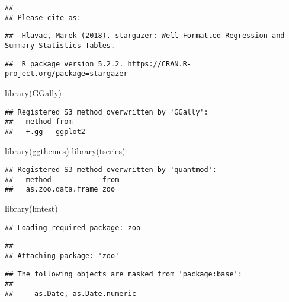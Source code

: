 \documentclass[
]{article}
\newenvironment{Shaded}{\begin{snugshade}}{\end{snugshade}}
\newcommand{\FunctionTok}[1]{\textcolor[rgb]{0.00,0.00,0.00}{#1}}
\newcommand{\NormalTok}[1]{#1}
\begin{document}
\begin{verbatim}
## 
## Please cite as:
\end{verbatim}

\begin{verbatim}
##  Hlavac, Marek (2018). stargazer: Well-Formatted Regression and Summary Statistics Tables.
\end{verbatim}

\begin{verbatim}
##  R package version 5.2.2. https://CRAN.R-project.org/package=stargazer
\end{verbatim}

\begin{Shaded}
\begin{Highlighting}[]
\FunctionTok{library}\NormalTok{(GGally)}
\end{Highlighting}
\end{Shaded}

\begin{verbatim}
## Registered S3 method overwritten by 'GGally':
##   method from   
##   +.gg   ggplot2
\end{verbatim}

\begin{Shaded}
\begin{Highlighting}[]
\FunctionTok{library}\NormalTok{(ggthemes)}
\FunctionTok{library}\NormalTok{(tseries)}
\end{Highlighting}
\end{Shaded}

\begin{verbatim}
## Registered S3 method overwritten by 'quantmod':
##   method            from
##   as.zoo.data.frame zoo
\end{verbatim}

\begin{Shaded}
\begin{Highlighting}[]
\FunctionTok{library}\NormalTok{(lmtest)}
\end{Highlighting}
\end{Shaded}

\begin{verbatim}
## Loading required package: zoo
\end{verbatim}

\begin{verbatim}
## 
## Attaching package: 'zoo'
\end{verbatim}

\begin{verbatim}
## The following objects are masked from 'package:base':
## 
##     as.Date, as.Date.numeric
\end{verbatim}
\end{document}
